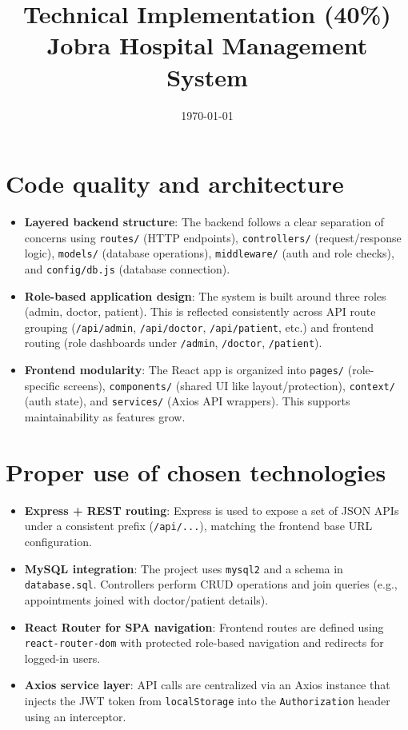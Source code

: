 \documentclass[12pt,a4paper]{article}
\title{Technical Implementation (40\%)\\Jobra Hospital Management System}
\author{}
\date{\today}
\begin{document}
\maketitle

\section{Code quality and architecture}
\begin{itemize}[leftmargin=*, itemsep=0.4em]
  \item \textbf{Layered backend structure}: The backend follows a clear separation of concerns using \texttt{routes/} (HTTP endpoints), \texttt{controllers/} (request/response logic), \texttt{models/} (database operations), \texttt{middleware/} (auth and role checks), and \texttt{config/db.js} (database connection).
  \item \textbf{Role-based application design}: The system is built around three roles (admin, doctor, patient). This is reflected consistently across API route grouping (\texttt{/api/admin}, \texttt{/api/doctor}, \texttt{/api/patient}, etc.) and frontend routing (role dashboards under \texttt{/admin}, \texttt{/doctor}, \texttt{/patient}).
  \item \textbf{Frontend modularity}: The React app is organized into \texttt{pages/} (role-specific screens), \texttt{components/} (shared UI like layout/protection), \texttt{context/} (auth state), and \texttt{services/} (Axios API wrappers). This supports maintainability as features grow.
\end{itemize}

\section{Proper use of chosen technologies}
\begin{itemize}[leftmargin=*, itemsep=0.4em]
  \item \textbf{Express + REST routing}: Express is used to expose a set of JSON APIs under a consistent prefix (\texttt{/api/...}), matching the frontend base URL configuration.
  \item \textbf{MySQL integration}: The project uses \texttt{mysql2} and a schema in \texttt{database.sql}. Controllers perform CRUD operations and join queries (e.g., appointments joined with doctor/patient details).
  \item \textbf{React Router for SPA navigation}: Frontend routes are defined using \texttt{react-router-dom} with protected role-based navigation and redirects for logged-in users.
  \item \textbf{Axios service layer}: API calls are centralized via an Axios instance that injects the JWT token from \texttt{localStorage} into the \texttt{Authorization} header using an interceptor.
\end{itemize}
\end{document}
